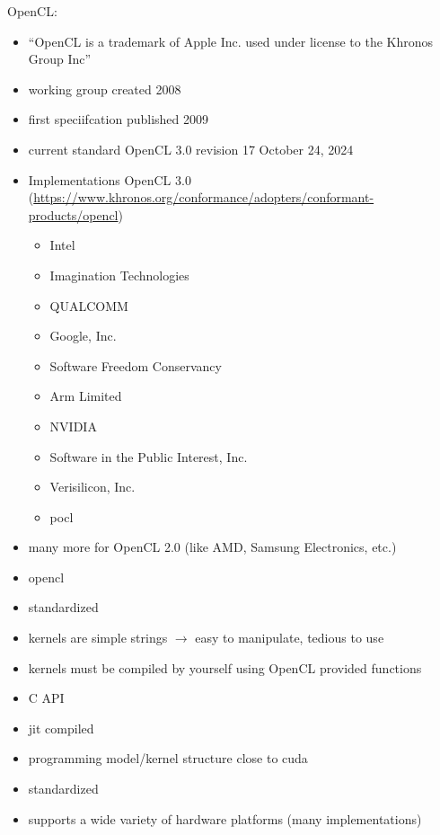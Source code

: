 \newpage


OpenCL:
\begin{itemize}
    \item \enquote{OpenCL is a trademark of Apple Inc. used under license to the Khronos Group Inc}
    \item working group created 2008~\cite{khronos_opencl_working_group_khronos_2008}
    \item first speciifcation published 2009~\cite{munshi_opencl_2009}
    \item current standard OpenCL 3.0 revision 17 October 24, 2024~\cite{khronos_opencl_working_group_opencl_2024}
    \item Implementations OpenCL 3.0 (\url{https://www.khronos.org/conformance/adopters/conformant-products/opencl})
    \begin{itemize}
        \item Intel
        \item Imagination Technologies
        \item QUALCOMM
        \item Google, Inc. 
        \item Software Freedom Conservancy
        \item Arm Limited
        \item NVIDIA
        \item Software in the Public Interest, Inc.
        \item Verisilicon, Inc.
        \item pocl
    \end{itemize}
    \item many more for OpenCL 2.0 (like AMD, Samsung Electronics, etc.)
\end{itemize}

\begin{itemize}
    \item \acrfull{opencl}
    \item standardized
    \item kernels are simple strings $\rightarrow$ easy to manipulate, tedious to use
    \item kernels must be compiled by yourself using OpenCL provided functions
    \item C API
    \item \gls{jit} compiled
    \item programming model/kernel structure close to \gls{cuda}
\end{itemize}

\begin{advantagebox}
    \begin{itemize}
        \item standardized
        \item supports a wide variety of hardware platforms (many implementations)
    \end{itemize}
\end{advantagebox}

